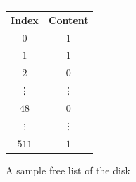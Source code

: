 \begin{figure}[htp!] \small
	\centering
	\begin{tabular}{|c|c|}
		\multicolumn{2}{c}{} \\ \toprule
		\textbf{Index} & \textbf{Content} \\ \toprule
		$0$ & $1$ \\ \hline
		$1$ & $1$ \\ \hline
		$2$ & $0$ \\ \hline
		\vdots & \vdots \\ \hline
		$48$ & $0$ \\ \hline
		$\vdots$ & \vdots \\ \hline
		$511$ & $1$ \\ \hline
	\end{tabular}
	\caption{A sample free list of the disk}
	\label{fig:disk free list}
\end{figure}

